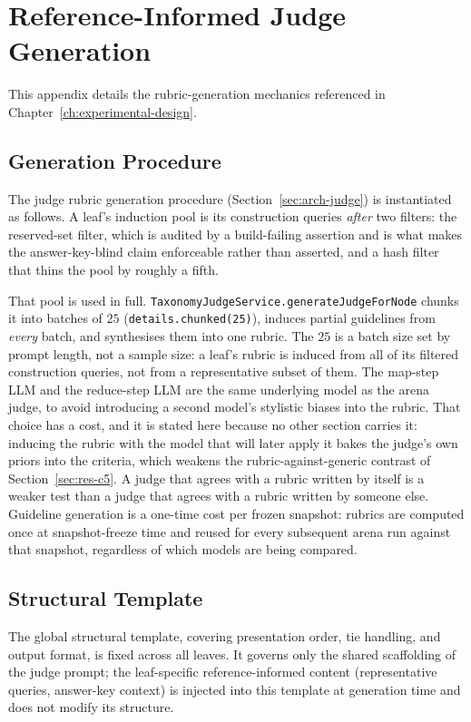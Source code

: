 \chapter{Reference-Informed Judge Generation}\label{app:judge-generation}

This appendix details the rubric-generation mechanics referenced in
Chapter~\ref{ch:experimental-design}.

\section{Generation Procedure}

The judge rubric generation procedure (Section~\ref{sec:arch-judge}) is
instantiated as follows. A leaf's induction pool is its construction
queries \emph{after} two filters: the reserved-set filter, which is audited
by a build-failing assertion and is what makes the answer-key-blind claim
enforceable rather than asserted, and a hash filter that thins the pool by
roughly a fifth.

That pool is used in full. \texttt{TaxonomyJudgeService.generateJudgeForNode}
chunks it into batches of $25$ (\texttt{details.chunked(25)}), induces partial
guidelines from \emph{every} batch, and synthesises them into one rubric. The
$25$ is a batch size set by prompt length, not a sample size: a leaf's rubric is
induced from all of its filtered construction queries, not from a representative
subset of them.
The map-step LLM and the reduce-step LLM are the same underlying model
as the arena judge, to avoid introducing a second
model's stylistic biases into the rubric. That choice has a cost, and
it is stated here because no other section carries it: inducing the
rubric with the model that will later apply it bakes the judge's own
priors into the criteria, which weakens the rubric-against-generic
contrast of Section~\ref{sec:res-c5}. A judge that agrees
with a rubric written by itself is a weaker test than a judge that
agrees with a rubric written by someone else. Guideline generation is
a one-time cost per frozen snapshot: rubrics are computed once at
snapshot-freeze time and reused for every subsequent arena run against
that snapshot, regardless of which models are being compared.

\section{Structural Template}\label{sec:judge-template-full}

The global structural template, covering presentation order, tie
handling, and output format, is fixed across all leaves. It governs
only the shared scaffolding of the judge prompt; the leaf-specific
reference-informed content (representative queries, answer-key
context) is injected into this template at generation time and does
not modify its structure.


